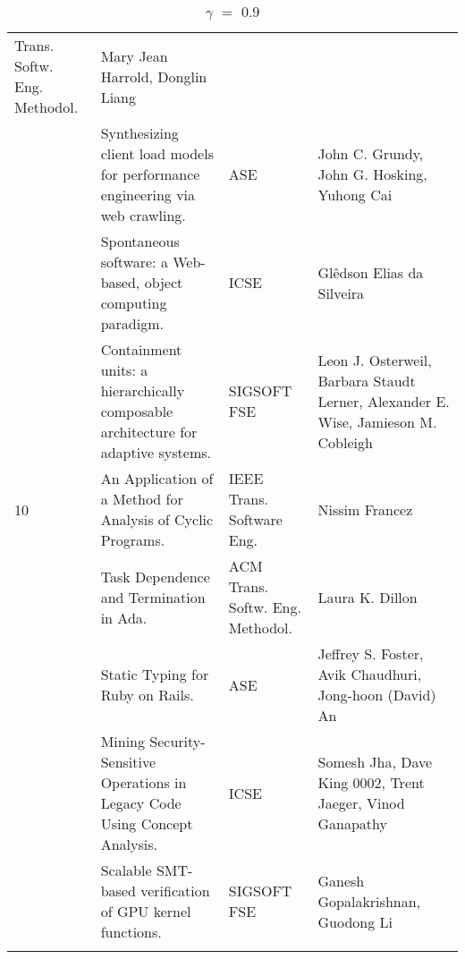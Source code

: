 \begin{center}
\begin{longtable}{|p{}p{}p{}p{}|}
Trans. Softw. Eng. Methodol.& Mary Jean Harrold, Donglin Liang \\
\rowcolor{black!20} & Synthesizing client load models for performance engineering via web crawling.& 
ASE& John C. Grundy, John G. Hosking, Yuhong Cai \\
 & Spontaneous software: a Web-based, object computing paradigm.& ICSE& Glêdson Elias da Silveira \\
\rowcolor{black!20} & Containment units: a hierarchically composable architecture for adaptive 
systems.& SIGSOFT FSE& Leon J. Osterweil, Barbara Staudt Lerner, Alexander E. Wise, Jamieson M. 
Cobleigh \\
10 & An Application of a Method for Analysis of Cyclic Programs.& IEEE Trans. Software Eng.& Nissim 
Francez \\
\rowcolor{black!20} & Task Dependence and Termination in Ada.& ACM Trans. Softw. Eng. Methodol.& 
Laura K. Dillon \\
 & Static Typing for Ruby on Rails.& ASE& Jeffrey S. Foster, Avik Chaudhuri, Jong-hoon (David) An \\
\rowcolor{black!20} & Mining Security-Sensitive Operations in Legacy Code Using Concept Analysis.& 
ICSE& Somesh Jha, Dave King 0002, Trent Jaeger, Vinod Ganapathy \\
 & Scalable SMT-based verification of GPU kernel functions.& SIGSOFT FSE& Ganesh Gopalakrishnan, 
Guodong Li \\
    \hline
    \caption{$\gamma$ $=$ $0.9$}
\end{longtable}
\end{center}